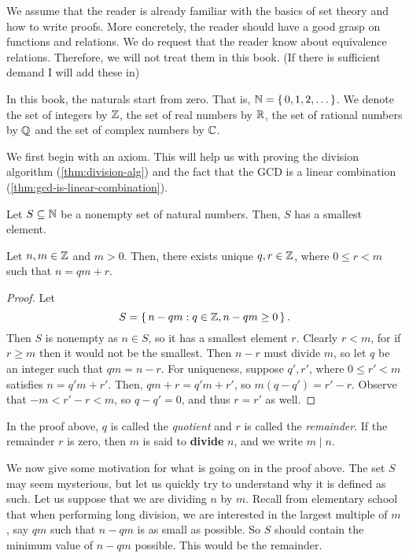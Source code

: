 \documentclass[./main.tex]{subfiles}
\begin{document}
We assume that the reader is already familiar with the basics of set theory and
how to write proofs. More concretely, the reader should have a good grasp on
functions and relations. We do request that the reader know about equivalence
relations. Therefore, we will not treat them in this book. (If there is
sufficient demand I will add these in)

In this book, the naturals start from zero. That is, $\mathbb{N} = \set{0, 1, 2,
\dots}$. We denote the set of integers by $\mathbb{Z}$, the set of real numbers by
$\mathbb{R}$, the set of rational numbers by $\mathbb{Q}$ and the set of complex numbers by
$\mathbb{C}$.

We first begin with an axiom. This will help us with proving the division
algorithm (\cref{thm:division-alg}) and the fact that the GCD is a linear
combination (\cref{thm:gcd-is-linear-combination}).
\begin{axiom}
Let $S \subseteq \mathbb{N}$ be a nonempty set of natural numbers. Then, $S$ has a smallest element.
\end{axiom}

\begin{theorem}
\label{thm:division-alg}
    Let $n, m \in \mathbb{Z}$ and $m > 0$. Then, there exists unique $q, r \in \mathbb{Z}$,
    where $0 \leq r < m$ such that $n = qm + r$.
\end{theorem}
\begin{proof}
    Let
    \[
    S = \set{n - qm: q \in \mathbb{Z}, n - qm \geq 0}.
    \]
    Then $S$ is nonempty as $n \in S$, so it has a smallest element $r$. Clearly
    $r < m$, for if $r \geq m$ then it would not be the smallest. Then $n - r$
    must divide $m$, so let $q$ be an integer such that $qm = n-r$. For
    uniqueness, suppose $q', r'$, where $0 \leq r' < m$ satisfies $n = q' m + r'$.
    Then, $qm + r = q'm + r'$, so $m(q-q') = r'-r$. Observe that $-m < r' - r <
    m$, so $q - q' = 0$, and thus $r = r'$ as well.
\end{proof}
In the proof above, $q$ is called the \emph{quotient} and $r$ is called the
\emph{remainder}. If the remainder $r$ is zero, then $m$ is said to
\textbf{divide} $n$, and we write $m \mid n$.

We now give some motivation for what is going on in the proof above. The set $S$
may seem mysterious, but let us quickly try to understand why it is defined as
such. Let us suppose that we are dividing $n$ by $m$. Recall from elementary
school that when performing long division, we are interested in the largest
multiple of $m$, say $qm$ such that $n - qm$ is as small as possible. So $S$
should contain the minimum value of $n-qm$ possible. This would be the
remainder. 
\end{document}
